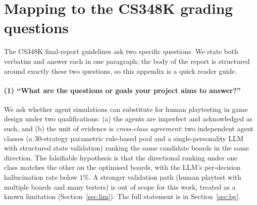 \documentclass[10pt]{article}
\begin{document}
\section{Mapping to the CS348K grading questions}\label{app:grading}

The CS348K final-report guidelines ask two specific questions. We
state both verbatim and answer each in one paragraph; the body of
the report is structured around exactly these two questions, so
this appendix is a quick reader guide.

\paragraph{(1) ``What are the questions or goals your project aims
to answer?''}
We ask whether agent simulations can substitute for human
playtesting in game design under two qualifications: (a) the agents
are imperfect and acknowledged as such, and (b) the unit of
evidence is \emph{cross-class agreement}: two independent agent
classes (a 30-strategy parametric rule-based pool and a
single-personality LLM with structured state validation) ranking
the same candidate boards in the same direction. The falsifiable
hypothesis is that the directional ranking under one class matches
the other on the optimised boards, with the LLM's per-decision
hallucination rate below $1\%$. A stronger validation path (human
playtest with multiple boards and many testers) is out of scope
for this work, treated as a known limitation
(Section~\ref{sec:lim}). The full statement is in
Section~\ref{sec:bg}.
\end{document}

